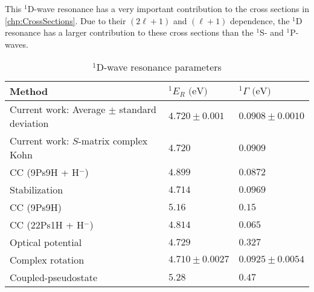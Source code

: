 \documentclass[Dissertation.tex]{subfiles}
\begin{document}
This $^1$D-wave resonance has a very important contribution to the cross
sections in \cref{chp:CrossSections}. Due to their $(2\ell+1)$ and $(\ell+1)$
dependence, the $^1$D resonance has a larger contribution to these cross
sections than the $^1$S- and $^1$P-waves.



\setlength{\abovecaptionskip}{6pt}   %
\setlength{\belowcaptionskip}{6pt}   %
\begin{table}[H]
\centering
\begin{tabular}{l l l}
\toprule
Method & $^1E_R \text{ (eV)}$ & $^1\Gamma \text{ (eV)}$ \\
\midrule
Current work: Average $\pm$ standard deviation & $4.720 \pm 0.001$ & $0.0908 \pm 0.0010$ \\
Current work: $S$-matrix complex Kohn & $4.720$ & $0.0909$ \\
CC (9Ps9H + H$^-$) \cite{Walters2004} & $4.899$ & $0.0872$ \\
Stabilization \cite{Yan2003} & $4.714$ & $0.0969$ \\
CC (9Ps9H) \cite{Blackwood2002} & $5.16$ & $0.15$ \\
CC (22Ps1H + H$^-$) \cite{Blackwood2002b} & $4.814$ & $0.065$ \\
Optical potential \cite{DiRienzi2002a} & $4.729$ & $0.327$ \\
Complex rotation \cite{Ho1998} & $4.710 \pm 0.0027$ & $0.0925 \pm 0.0054$  \\
Coupled-pseudostate \cite{Campbell1998} & $5.28$ & $0.47$ \\
\bottomrule
\end{tabular}
\caption{$^1$D-wave resonance parameters}
\label{tab:DWaveResonancesOther}
\end{table}



\biblio
\end{document}
